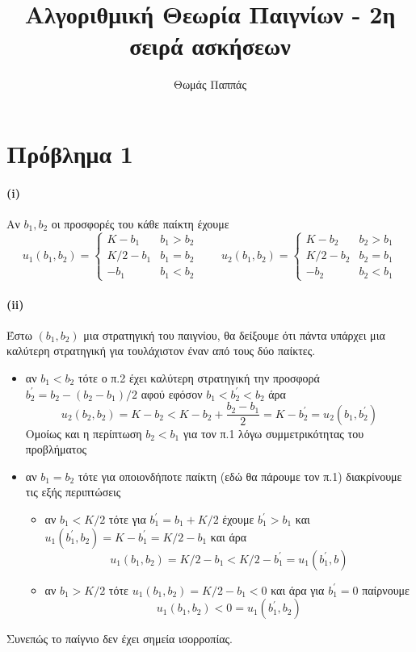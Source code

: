 \documentclass[a4paper,11pt]{article}
\begin{document}
\title{Αλγοριθμική Θεωρία Παιγνίων - 2η σειρά ασκήσεων}
\author{Θωμάς Παππάς}
\maketitle

\section*{Πρόβλημα 1}

\paragraph{(i)}
Αν $b_1,b_2$ οι προσφορές του κάθε παίκτη έχουμε
\[
	u_1(b_1,b_2) =
	\begin{cases}
		K-b_1 & b_1>b_2\\
		K/2-b_1 & b_1=b_2\\
		-b_1 & b_1<b_2
	\end{cases}
	\quad\quad
	u_2(b_1,b_2) =
	\begin{cases}
		K-b_2 & b_2>b_1\\
		K/2-b_2 & b_2=b_1\\
		-b_2 & b_2<b_1
	\end{cases}
\]

\paragraph{(ii)}
Έστω $(b_1,b_2)$ μια στρατηγική του παιγνίου, θα δείξουμε ότι πάντα υπάρχει μια καλύτερη στρατηγική για τουλάχιστον έναν από τους δύο παίκτες.
\begin{itemize}
	\item αν $b_1<b_2$ τότε ο π.2 έχει καλύτερη στρατηγική την προσφορά $b_2^\prime=b_2-(b_2-b_1)/2$ αφού εφόσον $b_1<b_2^\prime<b_2$ άρα
		\[u_2(b_2,b_2)=K-b_2<K-b_2+\frac{b_2-b_1}{2}=K-b_2^\prime=u_2(b_1,b_2^\prime)\]
		Ομοίως και η περίπτωση $b_2<b_1$ για τον π.1 λόγω συμμετρικότητας του προβλήματος
	\item αν $b_1=b_2$ τότε για οποιονδήποτε παίκτη (εδώ θα πάρουμε τον π.1) διακρίνουμε τις εξής περιπτώσεις
		\begin{itemize}
			\item αν $b_1<K/2$ τότε για  $b_1^\prime=b_1+K/2$ έχουμε $b_1^\prime>b_1$ και $u_1(b_1^\prime,b_2) = K-b_1^\prime = K/2-b_1$ και άρα
				\[u_1(b_1,b_2)=K/2-b_1<K/2-b_1^\prime=u_1(b_1^\prime,b)\]
			\item αν $b_1>K/2$ τότε $u_1(b_1,b_2)=K/2-b_1<0$ και άρα για $b_1^\prime=0$ παίρνουμε
				\[u_1(b_1,b_2)<0=u_1(b_1^\prime,b_2)\]
		\end{itemize}
\end{itemize}
Συνεπώς το παίγνιο δεν έχει σημεία ισορροπίας.
\end{document}

